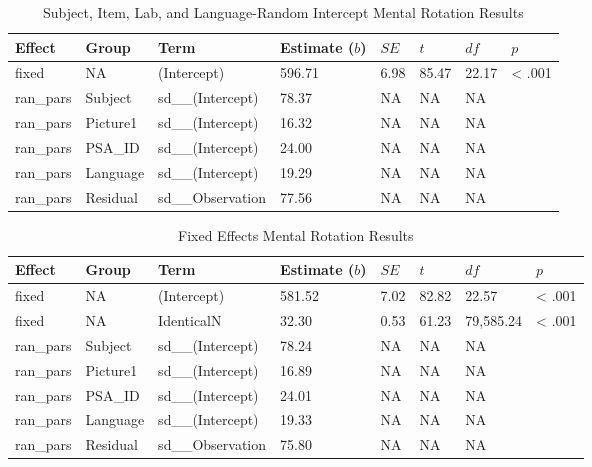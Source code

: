 \documentclass[
  man,mask,floatsintext]{apa7}
\begin{document}
\begin{table}[tbp]

\begin{center}
\begin{threeparttable}

\caption{\label{tab:lang_e}Subject, Item, Lab, and Language-Random Intercept Mental Rotation Results}

\begin{tabular}{llllllll}
\toprule
Effect & Group & Term & Estimate ($b$) & $SE$ & $t$ & $df$ & $p$\\
\midrule
fixed & NA & (Intercept) & 596.71 & 6.98 & 85.47 & 22.17 & < .001\\
ran\_pars & Subject & sd\_\_(Intercept) & 78.37 & NA & NA & NA & \\
ran\_pars & Picture1 & sd\_\_(Intercept) & 16.32 & NA & NA & NA & \\
ran\_pars & PSA\_ID & sd\_\_(Intercept) & 24.00 & NA & NA & NA & \\
ran\_pars & Language & sd\_\_(Intercept) & 19.29 & NA & NA & NA & \\
ran\_pars & Residual & sd\_\_Observation & 77.56 & NA & NA & NA & \\
\bottomrule
\end{tabular}

\end{threeparttable}
\end{center}

\end{table}

\begin{table}[tbp]

\begin{center}
\begin{threeparttable}

\caption{\label{tab:fixed_e}Fixed Effects Mental Rotation Results}

\begin{tabular}{llllllll}
\toprule
Effect & Group & Term & Estimate ($b$) & $SE$ & $t$ & $df$ & $p$\\
\midrule
fixed & NA & (Intercept) & 581.52 & 7.02 & 82.82 & 22.57 & < .001\\
fixed & NA & IdenticalN & 32.30 & 0.53 & 61.23 & 79,585.24 & < .001\\
ran\_pars & Subject & sd\_\_(Intercept) & 78.24 & NA & NA & NA & \\
ran\_pars & Picture1 & sd\_\_(Intercept) & 16.89 & NA & NA & NA & \\
ran\_pars & PSA\_ID & sd\_\_(Intercept) & 24.01 & NA & NA & NA & \\
ran\_pars & Language & sd\_\_(Intercept) & 19.33 & NA & NA & NA & \\
ran\_pars & Residual & sd\_\_Observation & 75.80 & NA & NA & NA & \\
\bottomrule
\end{tabular}

\end{threeparttable}
\end{center}

\end{table}
\end{document}
